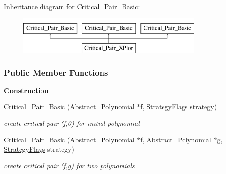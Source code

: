Inheritance diagram for Critical\+\_\+\+Pair\+\_\+\+Basic\+:\begin{figure}[H]
\begin{center}
\leavevmode
\includegraphics[height=1.917808cm]{group___g_b_computation}
\end{center}
\end{figure}
\subsubsection*{Public Member Functions}
\begin{Indent}\textbf{ Construction}\par
\begin{DoxyCompactItemize}
\item 
\mbox{\label{group___g_b_computation_a54a4115589e1c46851167727b5d21578}} 
\hyperlink{group___g_b_computation_a54a4115589e1c46851167727b5d21578}{Critical\+\_\+\+Pair\+\_\+\+Basic} (\hyperlink{group__polygroup_class_abstract___polynomial}{Abstract\+\_\+\+Polynomial} $\ast$f, \hyperlink{group__strategygroup_ga0ee6c8e033547330e6b89929730007f4}{Strategy\+Flags} strategy)
\begin{DoxyCompactList}\small\item\em create critical pair (f,0) for initial polynomial \end{DoxyCompactList}\item 
\mbox{\label{group___g_b_computation_a393b8f7069c8e641a982ba4d704d349c}} 
\hyperlink{group___g_b_computation_a393b8f7069c8e641a982ba4d704d349c}{Critical\+\_\+\+Pair\+\_\+\+Basic} (\hyperlink{group__polygroup_class_abstract___polynomial}{Abstract\+\_\+\+Polynomial} $\ast$f, \hyperlink{group__polygroup_class_abstract___polynomial}{Abstract\+\_\+\+Polynomial} $\ast$g, \hyperlink{group__strategygroup_ga0ee6c8e033547330e6b89929730007f4}{Strategy\+Flags} strategy)
\begin{DoxyCompactList}\small\item\em create critical pair (f,g) for two polynomials \end{DoxyCompactList}\end{DoxyCompactItemize}
\end{Indent}
